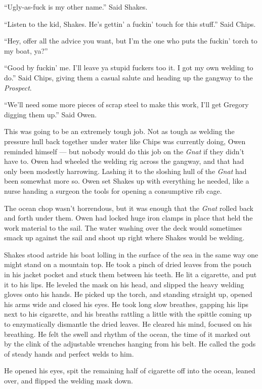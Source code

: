 \documentclass[
]{scrbook}
\begin{document}
``Ugly-as-fuck is my other name.'' Said Shakes.

``Listen to the kid, Shakes. He's gettin' a fuckin' touch for this
stuff.'' Said Chips.

``Hey, offer all the advice you want, but I'm the one who puts the
fuckin' torch to my boat, ya?''

``Good by fuckin' me. I'll leave ya stupid fuckers too it. I got my own
welding to do.'' Said Chips, giving them a casual salute and heading up
the gangway to the \emph{Prospect}.

``We'll need some more pieces of scrap steel to make this work, I'll get
Gregory digging them up.'' Said Owen.

This was going to be an extremely tough job. Not as tough as welding the
pressure hull back together under water like Chips was currently doing,
Owen reminded himself --- but nobody would do this job on the
\emph{Gnat} if they didn't have to. Owen had wheeled the welding rig
across the gangway, and that had only been modestly harrowing. Lashing
it to the sloshing hull of the \emph{Gnat} had been somewhat more so.
Owen set Shakes up with everything he needed, like a nurse handing a
surgeon the tools for opening a consumptive rib cage.

The ocean chop wasn't horrendous, but it was enough that the \emph{Gnat}
rolled back and forth under them. Owen had locked huge iron clamps in
place that held the work material to the sail. The water washing over
the deck would sometimes smack up against the sail and shoot up right
where Shakes would be welding.

Shakes stood astride his boat lolling in the surface of the sea in the
same way one might stand on a mountain top. He took a pinch of dried
leaves from the pouch in his jacket pocket and stuck them between his
teeth. He lit a cigarette, and put it to his lips. He leveled the mask
on his head, and slipped the heavy welding gloves onto his hands. He
picked up the torch, and standing straight up, opened his arms wide and
closed his eyes. He took long slow breathes, gapping his lips next to
his cigarette, and his breaths rattling a little with the spittle coming
up to enzymatically dismantle the dried leaves. He cleared his mind,
focused on his breathing. He felt the swell and rhythm of the ocean, the
time of it marked out by the clink of the adjustable wrenches hanging
from his belt. He called the gods of steady hands and perfect welds to
him.

He opened his eyes, spit the remaining half of cigarette off into the
ocean, leaned over, and flipped the welding mask down.
\end{document}
